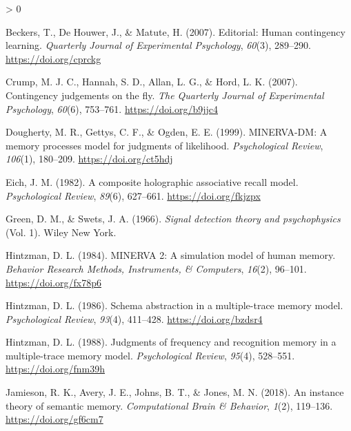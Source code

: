 \documentclass[
  english,
  man,floatsintext]{apa6}
\newlength{\cslhangindent}
\newenvironment{CSLReferences}[2] %
 {%
  \setlength{\parindent}{0pt}
  \ifodd #1 \everypar{\setlength{\hangindent}{\cslhangindent}}\ignorespaces\fi
  \ifnum #2 > 0
  \setlength{\parskip}{#2\baselineskip}
  \fi
 }%
 {}
\begin{document}
\begin{CSLReferences}{1}{0}
\leavevmode\hypertarget{ref-beckersEditorialHumanContingency2007}{}%
Beckers, T., De Houwer, J., \& Matute, H. (2007). Editorial: {Human} contingency learning. \emph{Quarterly Journal of Experimental Psychology}, \emph{60}(3), 289--290. \url{https://doi.org/cprckg}

\leavevmode\hypertarget{ref-crumpContingencyJudgementsFly2007}{}%
Crump, M. J. C., Hannah, S. D., Allan, L. G., \& Hord, L. K. (2007). Contingency judgements on the fly. \emph{The Quarterly Journal of Experimental Psychology}, \emph{60}(6), 753--761. \url{https://doi.org/b9jjc4}

\leavevmode\hypertarget{ref-doughertyMINERVADMMemoryProcesses1999}{}%
Dougherty, M. R., Gettys, C. F., \& Ogden, E. E. (1999). {MINERVA}-{DM}: {A} memory processes model for judgments of likelihood. \emph{Psychological Review}, \emph{106}(1), 180--209. \url{https://doi.org/ct5hdj}

\leavevmode\hypertarget{ref-eichCompositeHolographicAssociative1982}{}%
Eich, J. M. (1982). A composite holographic associative recall model. \emph{Psychological Review}, \emph{89}(6), 627--661. \url{https://doi.org/fkjzpx}

\leavevmode\hypertarget{ref-greenSignalDetectionTheory1966}{}%
Green, D. M., \& Swets, J. A. (1966). \emph{Signal detection theory and psychophysics} (Vol. 1). {Wiley New York}.

\leavevmode\hypertarget{ref-hintzmanMINERVASimulationModel1984}{}%
Hintzman, D. L. (1984). {MINERVA} 2: {A} simulation model of human memory. \emph{Behavior Research Methods, Instruments, \& Computers}, \emph{16}(2), 96--101. \url{https://doi.org/fx78p6}

\leavevmode\hypertarget{ref-hintzmanSchemaAbstractionMultipletrace1986}{}%
Hintzman, D. L. (1986). Schema abstraction in a multiple-trace memory model. \emph{Psychological Review}, \emph{93}(4), 411--428. \url{https://doi.org/bzdsr4}

\leavevmode\hypertarget{ref-hintzmanJudgmentsFrequencyRecognition1988}{}%
Hintzman, D. L. (1988). Judgments of frequency and recognition memory in a multiple-trace memory model. \emph{Psychological Review}, \emph{95}(4), 528--551. \url{https://doi.org/fnm39h}

\leavevmode\hypertarget{ref-jamiesonInstanceTheorySemantic2018}{}%
Jamieson, R. K., Avery, J. E., Johns, B. T., \& Jones, M. N. (2018). An instance theory of semantic memory. \emph{Computational Brain \& Behavior}, \emph{1}(2), 119--136. \url{https://doi.org/gf6cm7}


\end{CSLReferences}
\end{document}
